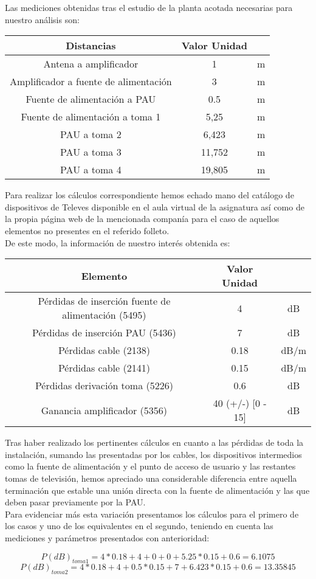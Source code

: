 \documentclass{article}[12 pt]
\begin{document}
		Las mediciones obtenidas tras el estudio de la planta acotada necesarias para nuestro análisis son:

		\begin{tabular}{| c | c | c |}
			\hline
			\textbf{Distancias} & \textbf{Valor} \textbf{Unidad}\\
			\hline
			Antena a amplificador & 1 & m\\
			\hline
			Amplificador a fuente de alimentación & 3 & m\\
			\hline
			Fuente de alimentación a PAU & 0.5 & m\\
			\hline
			Fuente de alimentación a toma 1 & 5,25 & m\\
			\hline
			PAU a toma 2 & 6,423 & m\\
			\hline
			PAU a toma 3 & 11,752 & m\\
			\hline
			PAU a toma 4  & 19,805 & m\\
			\hline
		\end{tabular}

		Para realizar los cálculos correspondiente hemos echado mano del catálogo de dispositivos de Televes disponible en el aula virtual de la asignatura así como de la propia página web de la mencionada companía para el caso de aquellos elementos no presentes en el referido folleto.\\

		De este modo, la información de nuestro interés obtenida es:

		\begin{tabular}{| c | c | c |}
			\hline
			\textbf{Elemento} & \textbf{Valor} \textbf{Unidad}\\
			\hline
			Pérdidas de inserción fuente de alimentación (5495) & 4 & dB\\
			\hline
			Pérdidas de inserción PAU (5436) & 7 & dB\\
			\hline
			Pérdidas cable (2138) & 0.18 & dB/m\\
			\hline
			Pérdidas cable (2141) & 0.15 & dB/m\\
			\hline
			Pérdidas derivación toma (5226) & 0.6 & dB\\
			\hline
			Ganancia amplificador (5356) & 40 (+/-) [0 - 15] & dB\\
			\hline
		\end{tabular}

		Tras haber realizado los pertinentes cálculos en cuanto a las pérdidas de toda la instalación, sumando las presentadas por los cables, los dispositivos intermedios como la fuente de alimentación y el punto de acceso de usuario y las restantes tomas de televisión, hemos apreciado una considerable diferencia entre aquella terminación que estable una unión directa con la fuente de alimentación y las que deben pasar previamente por la PAU.\\

		Para evidenciar más esta variación presentamos los cálculos para el primero de los casos y uno de los equivalentes en el segundo, teniendo en cuenta las mediciones y parámetros presentados con anterioridad:

		$$P(dB)_{toma1} = 4*0.18 + 4 + 0 + 0 + 5.25*0.15 + 0.6 = 6.1075$$
		$$P(dB)_{toma2} = 4*0.18 + 4 + 0.5*0.15 + 7 + 6.423*0.15 + 0.6 = 13.35845$$
\end{document}
